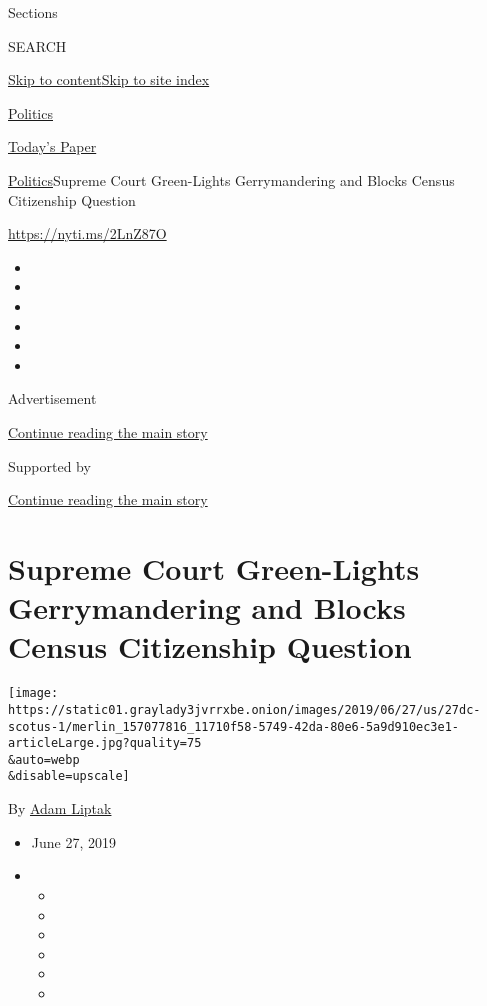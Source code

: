Sections

SEARCH

\protect\hyperlink{site-content}{Skip to
content}\protect\hyperlink{site-index}{Skip to site index}

\href{https://www.nytimes3xbfgragh.onion/section/politics}{Politics}

\href{https://myaccount.nytimes3xbfgragh.onion/auth/login?response_type=cookie\&client_id=vi}{}

\href{https://www.nytimes3xbfgragh.onion/section/todayspaper}{Today's
Paper}

\href{/section/politics}{Politics}\textbar{}Supreme Court Green-Lights
Gerrymandering and Blocks Census Citizenship Question

\url{https://nyti.ms/2LnZ87O}

\begin{itemize}
\item
\item
\item
\item
\item
\item
\end{itemize}

Advertisement

\protect\hyperlink{after-top}{Continue reading the main story}

Supported by

\protect\hyperlink{after-sponsor}{Continue reading the main story}

\hypertarget{supreme-court-green-lights-gerrymandering-and-blocks-census-citizenship-question}{%
\section{Supreme Court Green-Lights Gerrymandering and Blocks Census
Citizenship
Question}\label{supreme-court-green-lights-gerrymandering-and-blocks-census-citizenship-question}}

\texttt{[image: https://static01.graylady3jvrrxbe.onion/images/2019/06/27/us/27dc-scotus-1/merlin\_157077816\_11710f58-5749-42da-80e6-5a9d910ec3e1-articleLarge.jpg?quality=75\\\&auto=webp\\\&disable=upscale]}

By \href{https://www.nytimes3xbfgragh.onion/by/adam-liptak}{Adam Liptak}

\begin{itemize}
\item
  June 27, 2019
\item
  \begin{itemize}
  \item
  \item
  \item
  \item
  \item
  \item
  \end{itemize}
\end{itemize}

